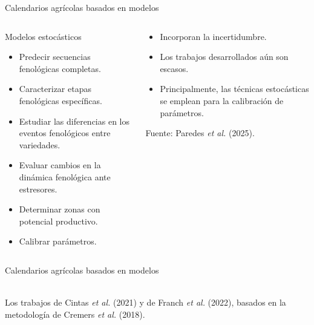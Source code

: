 \documentclass[aspectratio=169]{beamer}
\begin{document}
\begin{frame}{Calendarios agrícolas basados en modelos}
	\vspace*{-1cm}\begin{columns}
		\begin{block}{Modelos estocásticos}
			\begin{itemize}
				\item Predecir secuencias fenológicas completas.
				\item Caracterizar etapas fenológicas específicas.
				\item Estudiar las diferencias en los
				eventos fenológicos entre variedades.
				\item Evaluar cambios en
				la dinámica fenológica ante estresores.
				\item Determinar zonas con potencial productivo.
				\pause \item Calibrar parámetros.
			\end{itemize}
		\end{block}
		\pause
		\begin{block}{}
			\begin{itemize}
				\item Incorporan la incertidumbre.
				\item Los trabajos desarrollados aún son escasos.
				\item Principalmente, las técnicas estocásticas se emplean para la calibración de parámetros.
			\end{itemize}
			{\tiny Fuente: Paredes \textit{et al.} (2025).}
		\end{block}
	\end{columns}
\end{frame}


\begin{frame}{Calendarios agrícolas basados en modelos}
	\begin{center}
	\centering
	
	\pause \phantom{.}\\
	
	\pause
	Los trabajos de Cintas \textit{et al.} (2021) y de Franch \textit{et al.} (2022), basados en la metodología de Cremers \textit{et al.} (2018).
	\end{center}
\end{frame}
\end{document}
